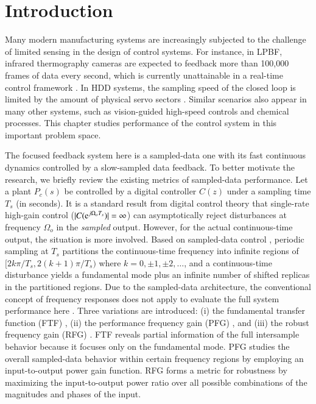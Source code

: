 \documentclass [11pt, proquest] {uwthesis}[2020/02/24]
\begin{document}
\section{Introduction}

Many modern manufacturing systems are increasingly
subjected to the challenge of limited sensing in the design of control
systems. For instance, in LPBF, infrared thermography cameras are expected to feedback more than 100,000 frames of data every second, which is currently unattainable in a
real-time control framework \cite{Berumen:2010hq,frazier2014metal}. In HDD systems, the sampling speed of the closed loop is limited by the amount of physical servo sectors
\cite{6387309,1461412}.
Similar scenarios also appear in many other systems, such as vision-guided
high-speed controls \cite{6605587,6926836} and chemical processes.
This chapter studies performance of the control system in this important
problem space.

The focused feedback system here is a sampled-data one with its fast
continuous dynamics controlled by a slow-sampled data feedback. To
better motivate the research, we briefly review the existing metrics
of sampled-data performance. Let a plant $P_{c}(s)$ be controlled
by a digital controller $C(z)$ under a sampling time $T_{s}$ (in
seconds). It is a standard result from digital control theory that
single-rate high-gain control (\emph{$|C(\mathrm{e}^{j\Omega_{o}T_{s}})|=\infty$})
can asymptotically reject disturbances at frequency $\Omega_{o}$
in the \emph{sampled} output. However, for the actual continuous-time
output, the situation is more involved. Based on sampled-data control
\cite{Yamamoto1996,Araki1996483,Hagiwara20011363,Yamamoto19941319,Goodwin19941263},
periodic sampling at $T_{s}$ partitions the continuous-time frequency
into infinite regions of $[2k\pi/T_{s},2(k+1)\pi/T_{s})$ where $k=0,\pm1,\pm2,\dots$,
and a continuous-time disturbance yields a fundamental mode plus an
infinite number of shifted replicas in the partitioned regions. Due
to the sampled-data architecture, the conventional concept of frequency
responses does not apply to evaluate the full system performance here
\cite{Yamamoto1996,Araki1996483,Hagiwara20011363,Yamamoto19941319,doi:10.1080/00207179508921961,Goodwin19941263}.
Three variations are introduced: (i) the fundamental transfer function
(FTF) \cite{Goodwin19941263}, (ii) the performance frequency gain
(PFG) \cite{lindgarde1997performance,Cantoni:ki}, and (iii) the robust
frequency gain (RFG) \cite{Yamamoto1996}. FTF reveals partial information
of the full intersample behavior because it focuses only on the fundamental
mode. PFG studies the overall sampled-data behavior within certain
frequency regions by employing an input-to-output power gain function\cite{oomen2007design}.
RFG forms a metric for robustness by maximizing the input-to-output
power ratio over all possible combinations of the magnitudes and phases
of the input\cite{lindgarde1999frequency}.
\end{document}
